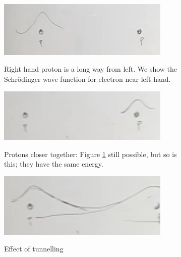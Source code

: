 \documentclass[]{article}
\begin{document}
\begin{figure}[H]
	\caption[Molecular forces: two protons and a single electron]{Two protons and a single electron. Classically electron can't swap between Figures \ref{fig:2proton1Electrona} and \ref{fig:2proton1Electronb}, but QM allows it to tunnel.}\label{fig:2protons:electron}
	\begin{subfigure}[t]{0.45\textwidth}
		\caption{Right hand proton is a long way from left. We show the Schr\"odinger wave function for electron near left hand.} 
		\includegraphics[width=0.9\textwidth]{2proton1Electrona}\label{fig:2proton1Electrona}
	\end{subfigure}
	\begin{subfigure}[t]{0.45\textwidth}
		\caption{Protons closer together: Figure \ref{fig:2proton1Electrona} still possible, but so is this; they have the same energy.}
		\includegraphics[width=0.9\textwidth]{2proton1Electronb}\label{fig:2proton1Electronb}
	\end{subfigure}
	\begin{subfigure}[t]{0.45\textwidth}
		\caption{Effect of tunnelling}
		\includegraphics[width=0.9\textwidth]{2proton1Electronab}\label{fig:2proton1Electronab}
	\end{subfigure}
	\begin{subfigure}[t]{0.45\textwidth}

\end{subfigure}
\end{figure}
\end{document}
